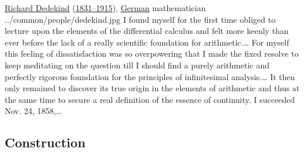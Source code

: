 \qboxnpq
  {\href{http://www-history.mcs.st-andrews.ac.uk/Mathematicians/Dedekind.html}{Richard Dedekind}
   (\href{http://www-history.mcs.st-andrews.ac.uk/Timelines/TimelineF.html}{1831--1915}),
   \href{http://www-history.mcs.st-andrews.ac.uk/BirthplaceMaps/Places/Germany.html}{German} mathematician
   \footnotemark
  }
  {../common/people/dedekind.jpg}
  {I found myself for the first time obliged to lecture upon the
   elements of the differential calculus and felt more keenly than ever before the
   lack of a really scientific foundation for arithmetic.\ldots
   For myself this feeling
   of dissatisfaction was so overpowering that I made the fixed resolve to keep
   meditating on the question till I should find a purely arithmetic and perfectly
   rigorous foundation for the principles of infinitesimal analysis.\ldots
   It then only remained to
   discover its true origin in the elements of arithmetic and thus at the same time
   to secure a real definition of the essence of continuity.
   I succeeded Nov. 24, 1858,\ldots}


\subsection{Construction}
\begin{definition}
\label{def:cut}
\end{definition}

